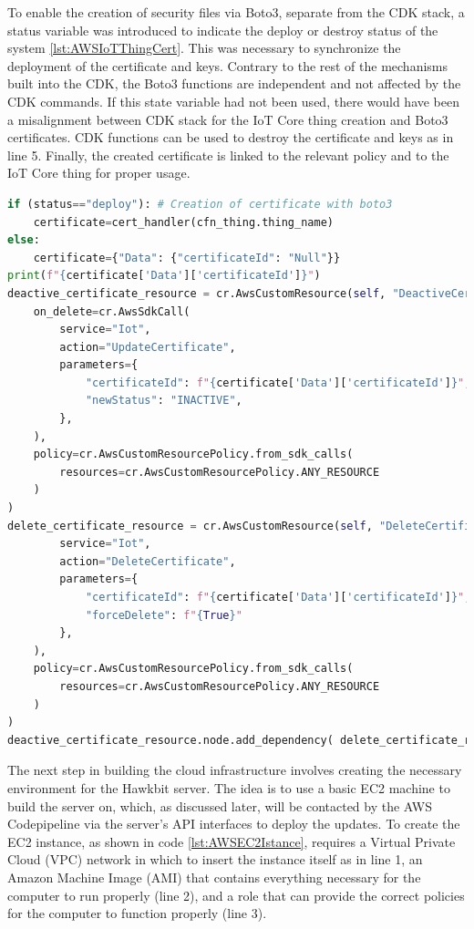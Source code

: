 To enable the creation of security files via Boto3, separate from the CDK stack, a status variable was introduced to indicate the deploy or destroy status of the system \ref{lst:AWSIoTThingCert}. This was necessary to synchronize the deployment of the certificate and keys. Contrary to the rest of the mechanisms built into the CDK, the Boto3 functions are independent and not affected by the CDK commands. If this state variable had not been used, there would have been a misalignment between CDK stack for the IoT Core thing creation and Boto3 certificates. CDK functions can be used to destroy the certificate and keys as in line 5. Finally, the created certificate is linked to the relevant policy and to the IoT Core thing for proper usage.
\begin{lstlisting}[language=Python, caption={Code for the creation and destruction of IoT Core Thing certificates and keys from the CDK stack}, label=lst:AWSIoTThingCert]
if (status=="deploy"): # Creation of certificate with boto3
    certificate=cert_handler(cfn_thing.thing_name)
else:
    certificate={"Data": {"certificateId": "Null"}}
print(f"{certificate['Data']['certificateId']}")
deactive_certificate_resource = cr.AwsCustomResource(self, "DeactiveCertificateResource",
    on_delete=cr.AwsSdkCall(
        service="Iot",
        action="UpdateCertificate",
        parameters={
            "certificateId": f"{certificate['Data']['certificateId']}",
            "newStatus": "INACTIVE",
        },
    ),
    policy=cr.AwsCustomResourcePolicy.from_sdk_calls(
        resources=cr.AwsCustomResourcePolicy.ANY_RESOURCE
    )
)
delete_certificate_resource = cr.AwsCustomResource(self, "DeleteCertificateResource", # Destruction of certificates
        service="Iot",
        action="DeleteCertificate",
        parameters={
            "certificateId": f"{certificate['Data']['certificateId']}",
            "forceDelete": f"{True}"
        },
    ),
    policy=cr.AwsCustomResourcePolicy.from_sdk_calls(
        resources=cr.AwsCustomResourcePolicy.ANY_RESOURCE
    )
)
deactive_certificate_resource.node.add_dependency( delete_certificate_resource )
\end{lstlisting}

The next step in building the cloud infrastructure involves creating the necessary environment for the Hawkbit server. The idea is to use a basic EC2 machine to build the server on, which, as discussed later, will be contacted by the AWS Codepipeline via the server's API interfaces to deploy the updates. To create the EC2 instance, as shown in code \ref{lst:AWSEC2Istance}, requires a Virtual Private Cloud (VPC) network in which to insert the instance itself as in line 1, an Amazon Machine Image (AMI) that contains everything necessary for the computer to run properly (line 2), and a role that can provide the correct policies for the computer to function properly (line 3).

